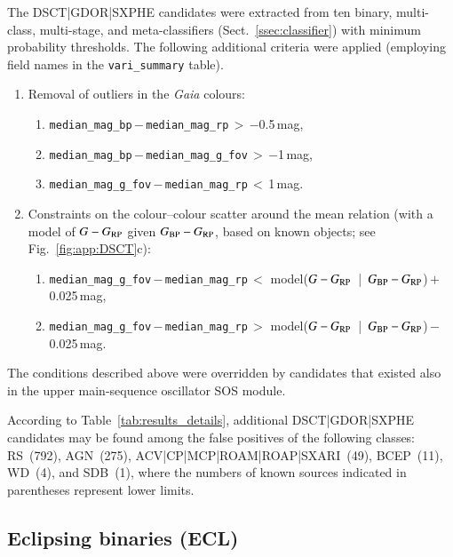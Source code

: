 \documentclass[longauth]{aa}
\def\gaia{\textit{Gaia}\xspace}
\def\bprp{\mbox{$G_{\rm BP}-G_{\rm RP}$}\xspace}
\def\grp{\mbox{$G-G_{\rm RP}$}\xspace}
\begin{document}
The DSCT|GDOR|SXPHE candidates were extracted from ten binary, multi-class, multi-stage, and meta-classifiers (Sect.~\ref{ssec:classifier}) with minimum probability thresholds. The following additional criteria were applied (employing field names in the \texttt{vari\_summary} table).
\begin{enumerate}
    \item Removal of outliers in the \gaia colours: 
    \begin{enumerate}
    \item \texttt{median\_mag\_bp}\,$-$\,\texttt{median\_mag\_rp}\,$>$\,$-$0.5\,mag,
    \item \texttt{median\_mag\_bp}\,$-$\,\texttt{median\_mag\_g\_fov}\,$>$\,$-$1\,mag,
    \item \texttt{median\_mag\_g\_fov}\,$-$\,\texttt{median\_mag\_rp}\,$<$\,1\,mag.
    \end{enumerate}
    \item Constraints on the colour--colour scatter around the mean relation (with a model of \grp given \bprp, based on known objects; see Fig.~\ref{fig:app:DSCT}c): 
    \begin{enumerate}
    \item \texttt{median\_mag\_g\_fov}\,$-$\,\texttt{median\_mag\_rp}\,$<$ \break model(\grp~|~\bprp)\,$+$\,0.025\,mag,
    \item \texttt{median\_mag\_g\_fov}\,$-$\,\texttt{median\_mag\_rp}\,$>$ \break model(\grp~|~\bprp)\,$-$\,0.025\,mag.
    \end{enumerate}
\end{enumerate}
The conditions described above were overridden by candidates that existed also in the upper main-sequence oscillator SOS module.

According to Table~\ref{tab:results_details}, additional DSCT|GDOR|SXPHE candidates may be found among the false positives of the following classes: RS~(792), AGN~(275),  ACV|CP|MCP|ROAM|ROAP|SXARI~(49), BCEP~(11), WD~(4), and SDB~(1), where the numbers of known sources indicated in parentheses represent lower limits.


\subsection{Eclipsing binaries (ECL)\label{ssec:ecl}}
\end{document}

